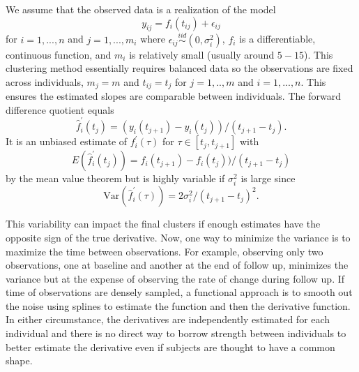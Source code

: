 We assume that the observed data is a realization of the model
$$y_{ij}= f_i(t_{ij})+\epsilon_{ij}$$
for $i=1,...,n$ and $j=1,...,m_{i}$ where $\epsilon_{ij}\overset{iid}{\sim} (0,\sigma_{i}^{2})$, $f_{i}$ is a differentiable, continuous function, and $m_{i}$ is relatively small (usually around $5-15$). This clustering method essentially requires balanced data so the observations are fixed across individuals, $m_{j}=m$ and $t_{ij} = t_{j}$ for $j=1,..,m$ and $i=1,...,n$. This ensures the estimated slopes are comparable between individuals. The forward difference quotient equals 
$$\hat{f}_{i}^{'}(t_{j}) = (y_i(t_{j+1})-y_i(t_j))/(t_{j+1}-t_j).$$
It is an unbiased estimate of $f_{i}^{'}(\tau)$ for $\tau\in[t_{j},t_{j+1}]$ with
$$E(\hat{f}_{i}^{'}(t_{j})) = f_i(t_{j+1})-f_i(t_j))/(t_{j+1}-t_j)$$
by the mean value theorem but is highly variable if $\sigma_{i}^{2}$ is large since
$$\text{Var}(\hat{f}_{i}^{'}(\tau)) =  2\sigma^{2}_{i}/ (t_{j+1}-t_j)^{2}.$$

This variability can impact the final clusters if enough estimates have the opposite sign of the true derivative. Now, one way to minimize the variance is to maximize the time between observations. For example, observing only two observations, one at baseline and another at the end of follow up, minimizes the variance but at the expense of observing the rate of change during follow up. If time of observations are densely sampled, a functional approach is to smooth out the noise using splines to estimate the function and then the derivative function. In either circumstance, the derivatives are independently estimated for each individual and there is no direct way to borrow strength between individuals to better estimate the derivative even if subjects are thought to have a common shape. 

